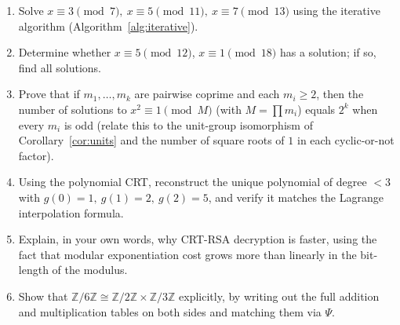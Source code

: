 \documentclass[11pt]{article}
\theoremstyle{definition}
\theoremstyle{remark}
\newcommand{\Z}{\mathbb{Z}}
\begin{document}
\begin{enumerate}[label=(\arabic*)]
\item Solve $x\equiv3\pmod7,\ x\equiv5\pmod{11},\ x\equiv7\pmod{13}$ using the iterative algorithm (Algorithm~\ref{alg:iterative}).
\item Determine whether $x\equiv5\pmod{12}$, $x\equiv1\pmod{18}$ has a solution; if so, find all solutions.
\item Prove that if $m_1,\dots,m_k$ are pairwise coprime and each $m_i \ge 2$, then the number of solutions to $x^2\equiv1\pmod M$ (with $M=\prod m_i$) equals $2^k$ when every $m_i$ is odd (relate this to the unit-group isomorphism of Corollary~\ref{cor:units} and the number of square roots of $1$ in each cyclic-or-not factor).
\item Using the polynomial CRT, reconstruct the unique polynomial of degree $<3$ with $g(0)=1,\ g(1)=2,\ g(2)=5$, and verify it matches the Lagrange interpolation formula.
\item Explain, in your own words, why CRT-RSA decryption is faster, using the fact that modular exponentiation cost grows more than linearly in the bit-length of the modulus.
\item Show that $\Z/6\Z \cong \Z/2\Z\times\Z/3\Z$ explicitly, by writing out the full addition and multiplication tables on both sides and matching them via $\Psi$.
\end{enumerate}
\end{document}
